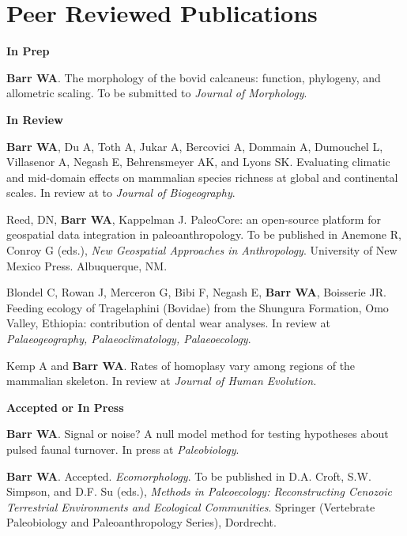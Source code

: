 \documentclass{article}
\begin{document}
\section*{Peer Reviewed Publications}
\begin{description*}
\item[] {\bfseries In Prep}

\item[] {\bfseries Barr WA}.  The morphology of the bovid calcaneus: function, phylogeny, and allometric scaling. To be submitted to \emph{Journal of Morphology}.
\end{description*}

\begin{description*}
\item[] {\bfseries In Review}
\item[]{\bfseries Barr WA}, Du A, Toth A, Jukar A,  Bercovici A,  Dommain A,  Dumouchel L,  Villasenor A,  Negash E, Behrensmeyer AK, and Lyons SK. Evaluating climatic and mid-domain effects on mammalian species richness at global and continental scales. In review at to \emph{Journal of Biogeography}.
\item[] Reed, DN, {\bfseries Barr WA}, Kappelman J. PaleoCore: an open-source platform for geospatial data integration in paleoanthropology. To be published in Anemone R, Conroy G (eds.), \emph{New Geospatial Approaches in Anthropology}. University of New Mexico Press. Albuquerque, NM.
\item[] Blondel C, Rowan J, Merceron G, Bibi F,  Negash E, {\bfseries Barr WA}, Boisserie JR. Feeding ecology of Tragelaphini (Bovidae) from the Shungura Formation, Omo Valley, Ethiopia: contribution of dental wear analyses. In review at \emph{Palaeogeography, Palaeoclimatology, Palaeoecology}.

\item[] Kemp A and {\bfseries Barr WA}. Rates of homoplasy vary among regions of the mammalian skeleton. In review at \emph{Journal of Human Evolution.} 
\end{description*}

\begin{description*}
\item[] {\bfseries Accepted or In Press}
\item[] {\bfseries Barr WA}. Signal or noise? A null model method for testing hypotheses about pulsed faunal turnover. In press at \emph{Paleobiology}.
\item[] {\bfseries Barr WA}. Accepted.  \emph{Ecomorphology}. To be published in D.A. Croft, S.W. Simpson, and D.F. Su (eds.),  \emph{Methods in Paleoecology: Reconstructing Cenozoic Terrestrial Environments and Ecological Communities}. Springer (Vertebrate Paleobiology and Paleoanthropology Series), Dordrecht.
\end{description*}
\end{document}
